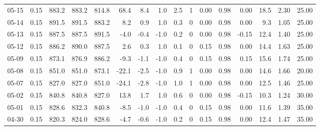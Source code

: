 \begin{threeparttable}
{\begin{tabular}{lrrrrrrrrrrrrrrr}
  05-15 &     0.15 & 883.2 & 883.2 & 814.8 &       68.4 &            8.4 &                      1.0 &                 2.5 &              1 &       0.00 &      0.98 &           0.00 &             18.5 &            2.30 &                  25.00 \\
  05-14 &     0.15 & 891.5 & 891.5 & 883.2 &        8.2 &            0.9 &                      1.0 &                 0.3 &              0 &       0.00 &      0.98 &           0.00 &              9.3 &            1.05 &                  25.00 \\
  05-13 &     0.15 & 887.5 & 887.5 & 891.5 &       -4.0 &           -0.4 &                     -1.0 &                 0.2 &              0 &       0.00 &      0.98 &          -0.15 &             12.4 &            1.40 &                  25.00 \\
  05-12 &     0.15 & 886.2 & 890.0 & 887.5 &        2.6 &            0.3 &                      1.0 &                 0.1 &              0 &       0.15 &      0.98 &           0.00 &             14.4 &            1.63 &                  25.00 \\
  05-09 &     0.15 & 873.1 & 876.9 & 886.2 &       -9.3 &           -1.1 &                     -1.0 &                 0.4 &              0 &       0.15 &      0.98 &           0.15 &             15.6 &            1.74 &                  25.00 \\
  05-08 &     0.15 & 851.0 & 851.0 & 873.1 &      -22.1 &           -2.5 &                     -1.0 &                 0.9 &              1 &       0.00 &      0.98 &           0.00 &             14.6 &            1.66 &                  20.00 \\
  05-07 &     0.15 & 827.0 & 827.0 & 851.0 &      -24.1 &           -2.8 &                     -1.0 &                 1.0 &              1 &       0.00 &      0.98 &           0.00 &             12.5 &            1.46 &                  25.00 \\
  05-02 &     0.15 & 840.8 & 840.8 & 827.0 &       13.8 &            1.7 &                      1.0 &                 0.6 &              0 &       0.00 &      0.98 &          -0.15 &             10.3 &            1.24 &                  30.00 \\
  05-01 &     0.15 & 828.6 & 832.3 & 840.8 &       -8.5 &           -1.0 &                     -1.0 &                 0.4 &              0 &       0.15 &      0.98 &           0.00 &             11.6 &            1.39 &                  35.00 \\
  04-30 &     0.15 & 820.3 & 824.0 & 828.6 &       -4.7 &           -0.6 &                     -1.0 &                 0.2 &              0 &       0.15 &      0.98 &           0.00 &             12.4 &            1.47 &                  35.00 \\

\end{tabular}}
\end{threeparttable}
